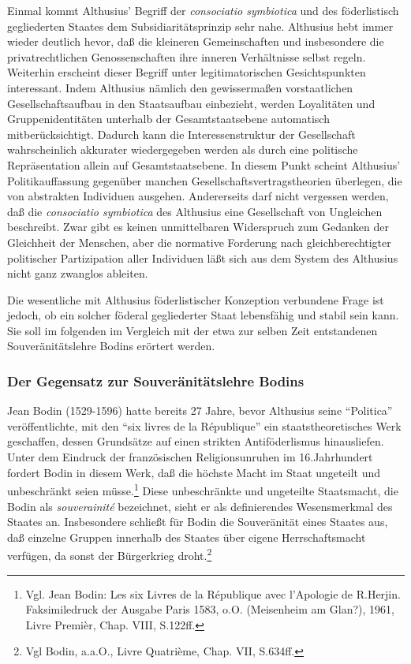 \documentclass[a4paper,12pt]{article}
\begin{document}
Einmal kommt Althusius' Begriff der {\em consociatio symbiotica}
und des föderlistisch gegliederten Staates dem
Subsidiaritätsprinzip sehr nahe. Althusius hebt immer wieder
deutlich hevor, daß die kleineren Gemeinschaften und insbesondere
die privatrechtlichen Genossenschaften ihre inneren Verhältnisse
selbst regeln. Weiterhin erscheint dieser Begriff unter
legitimatorischen Gesichtspunkten interessant. Indem Althusius
nämlich den gewissermaßen vorstaatlichen Gesellschaftsaufbau in den
Staatsaufbau einbezieht, werden Loyalitäten und Gruppenidentitäten
unterhalb der Gesamtstaatsebene automatisch
mitberücksichtigt. Dadurch kann die Interessenstruktur der
Gesellschaft wahrscheinlich akkurater wiedergegeben werden als
durch eine politische Repräsentation allein auf Gesamtstaatsebene.
In diesem Punkt scheint Althusius' Politikauffassung gegenüber
manchen Gesellschaftsvertragstheorien überlegen, die von abstrakten
Individuen ausgehen. Andererseits darf nicht vergessen werden, daß
die {\em consociatio symbiotica} des Althusius eine Gesellschaft
von Ungleichen beschreibt. Zwar gibt es keinen unmittelbaren
Widerspruch zum Gedanken der Gleichheit der Menschen, aber die
normative Forderung nach gleichberechtigter politischer
Partizipation aller Individuen läßt sich aus dem System des
Althusius nicht ganz zwanglos ableiten.

Die wesentliche mit Althusius föderlistischer Konzeption
verbundene Frage ist jedoch, ob ein solcher föderal gegliederter
Staat lebensfähig und stabil sein kann. Sie soll im folgenden im
Vergleich mit der etwa zur selben Zeit entstandenen
Souveränitätslehre Bodins erörtert werden.

\subsubsection{Der Gegensatz zur Souveränitätslehre Bodins}

Jean Bodin (1529-1596) hatte bereits 27 Jahre, bevor Althusius seine
"`Politica"' veröffentlichte, mit den "`six livres de la R\'epublique"' ein
staatstheoretisches Werk geschaffen, dessen Grundsätze auf einen strikten
Antiföderlismus hinausliefen. Unter dem Eindruck der französischen
Religionsunruhen im 16.Jahrhundert fordert Bodin in diesem Werk, daß die
höchste Macht im Staat ungeteilt und unbeschränkt seien müsse.\footnote{Vgl.
  Jean Bodin\cite{bodin}: Les six Livres de la R\'epublique avec l'Apologie de
  R.Herjin. Faksimiledruck der Ausgabe Paris 1583, o.O. (Meisenheim am Glan?),
  1961, Livre Premi\`er, Chap. VIII, S.122ff.} Diese unbeschränkte und
ungeteilte Staatsmacht, die Bodin als {\em souverainit\'e} bezeichnet, sieht
er als definierendes Wesensmerkmal des Staates an. Insbesondere schließt für
Bodin die Souveränität eines Staates aus, daß einzelne Gruppen innerhalb des
Staates über eigene Herrschaftsmacht verfügen, da sonst der Bürgerkrieg
droht.\footnote{Vgl Bodin\cite{bodin}, a.a.O., Livre Quatri\`eme, Chap. VII,
  S.634ff.}
\end{document}
